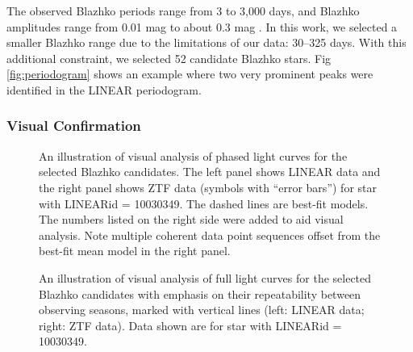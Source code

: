 The observed Blazhko periods range from 3 to 3,000 days, and Blazhko amplitudes range from 0.01 mag to about 0.3 mag \citep{2007MNRAS.377.1263S}. In this work, we selected a smaller Blazhko range due to the limitations of our data: 30--325 days. 
With this additional constraint, we selected 52 candidate Blazhko stars. 
Fig \ref{fig:periodogram} shows an example where two very prominent peaks were identified in the LINEAR periodogram. 



\subsubsection{Visual Confirmation}

\begin{figure}[ht]
  \centering
  \caption{An illustration of visual analysis of phased light curves for the selected Blazhko candidates. The left
    panel shows LINEAR data and the right panel shows ZTF data
    (symbols with ``error bars'') for star with LINEARid = 10030349. The dashed
    lines are best-fit models. The numbers listed on the right side were added to aid  visual analysis. Note
    multiple coherent data point sequences offset from the best-fit mean model in the right panel.}
       \label{fig:phase1}
\end{figure}

\begin{figure}[ht] 
    \centering
       \caption{An illustration of visual analysis of full light curves for the selected Blazhko candidates with emphasis
         on their repeatability between observing seasons, marked with  vertical lines (left: LINEAR data; right: ZTF data). Data
         shown are for star with LINEARid = 10030349. }
         \label{fig:phase3}
\end{figure}
       
